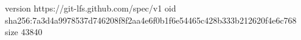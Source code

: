 version https://git-lfs.github.com/spec/v1
oid sha256:7a3d4a9978537d746208f8f2aa4e6f0b1f6e54465c428b333b212620f4e6c768
size 43840
